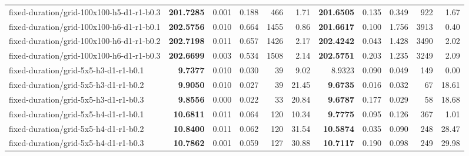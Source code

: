 \documentclass[10pt]{article}
\begin{document}
\begin{tabular}{p{65mm}rrrrrrrrrr}
fixed-\allowbreak duration/\allowbreak grid-\allowbreak 100x100-\allowbreak h5-\allowbreak d1-\allowbreak r1-\allowbreak b0.3 & \textbf{201.7285} & 0.001 & 0.188 & 466 & 1.71 & \textbf{201.6505} & 0.135 & 0.349 & 922 & 1.67 \\
fixed-\allowbreak duration/\allowbreak grid-\allowbreak 100x100-\allowbreak h6-\allowbreak d1-\allowbreak r1-\allowbreak b0.1 & \textbf{202.5756} & 0.010 & 0.664 & 1455 & 0.86 & \textbf{201.6617} & 0.100 & 1.756 & 3913 & 0.40 \\
fixed-\allowbreak duration/\allowbreak grid-\allowbreak 100x100-\allowbreak h6-\allowbreak d1-\allowbreak r1-\allowbreak b0.2 & \textbf{202.7198} & 0.011 & 0.657 & 1426 & 2.17 & \textbf{202.4242} & 0.043 & 1.428 & 3490 & 2.02 \\
fixed-\allowbreak duration/\allowbreak grid-\allowbreak 100x100-\allowbreak h6-\allowbreak d1-\allowbreak r1-\allowbreak b0.3 & \textbf{202.6699} & 0.003 & 0.534 & 1508 & 2.14 & \textbf{202.5751} & 0.203 & 1.235 & 3249 & 2.09 \\
fixed-\allowbreak duration/\allowbreak grid-\allowbreak 5x5-\allowbreak h3-\allowbreak d1-\allowbreak r1-\allowbreak b0.1 & \textbf{9.7377} & 0.010 & 0.030 & 39 & 9.02 & 8.9323 & 0.090 & 0.049 & 149 & 0.00 \\
fixed-\allowbreak duration/\allowbreak grid-\allowbreak 5x5-\allowbreak h3-\allowbreak d1-\allowbreak r1-\allowbreak b0.2 & \textbf{9.9050} & 0.010 & 0.027 & 39 & 21.45 & \textbf{9.6735} & 0.016 & 0.032 & 67 & 18.61 \\
fixed-\allowbreak duration/\allowbreak grid-\allowbreak 5x5-\allowbreak h3-\allowbreak d1-\allowbreak r1-\allowbreak b0.3 & \textbf{9.8556} & 0.000 & 0.022 & 33 & 20.84 & \textbf{9.6787} & 0.177 & 0.029 & 58 & 18.68 \\
fixed-\allowbreak duration/\allowbreak grid-\allowbreak 5x5-\allowbreak h4-\allowbreak d1-\allowbreak r1-\allowbreak b0.1 & \textbf{10.6811} & 0.011 & 0.064 & 120 & 10.34 & \textbf{9.7775} & 0.095 & 0.126 & 367 & 1.01 \\
fixed-\allowbreak duration/\allowbreak grid-\allowbreak 5x5-\allowbreak h4-\allowbreak d1-\allowbreak r1-\allowbreak b0.2 & \textbf{10.8400} & 0.011 & 0.062 & 120 & 31.54 & \textbf{10.5874} & 0.035 & 0.090 & 248 & 28.47 \\
fixed-\allowbreak duration/\allowbreak grid-\allowbreak 5x5-\allowbreak h4-\allowbreak d1-\allowbreak r1-\allowbreak b0.3 & \textbf{10.7862} & 0.001 & 0.059 & 127 & 30.88 & \textbf{10.7117} & 0.190 & 0.098 & 249 & 29.98 \\

\end{tabular}
\end{document}
